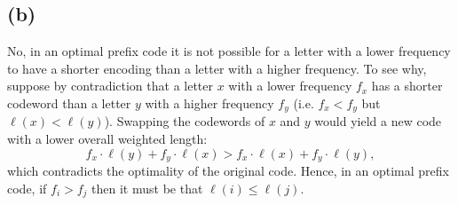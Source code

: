 \documentclass[11pt]{article}
\begin{document}
    \subsection*{(b)}
    No, in an optimal prefix code it is not possible for a letter with a lower frequency to have a shorter encoding than a letter with a higher frequency. To see why, suppose by contradiction that a letter \( x \) with a lower frequency \( f_x \) has a shorter codeword than a letter \( y \) with a higher frequency \( f_y \) (i.e. \( f_x < f_y \) but \(\ell(x) < \ell(y)\)). Swapping the codewords of \( x \) and \( y \) would yield a new code with a lower overall weighted length:
    \[
    f_x \cdot \ell(y) + f_y \cdot \ell(x) > f_x \cdot \ell(x) + f_y \cdot \ell(y),
    \]
    which contradicts the optimality of the original code. Hence, in an optimal prefix code, if \( f_i > f_j \) then it must be that \( \ell(i) \le \ell(j) \).
        
\end{document}
